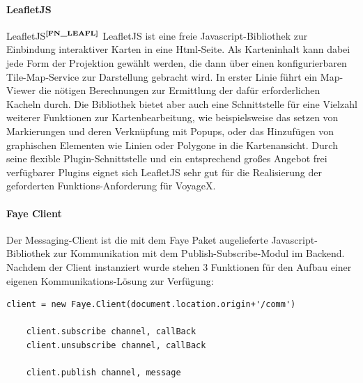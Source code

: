 \paragraph{LeafletJS}{LeafletJS$^{\textbf{\ref{FN_LEAFL}}}$}\label{LEAFL}
LeafletJS ist eine freie Javascript-Bibliothek zur Einbindung interaktiver Karten in eine Html-Seite. Als Karteninhalt kann dabei jede Form der Projektion gewählt werden, die dann über einen konfigurierbaren Tile-Map-Service zur Darstellung gebracht wird. In erster Linie führt ein Map-Viewer die nötigen Berechnungen zur Ermittlung der dafür erforderlichen Kacheln durch. Die Bibliothek bietet aber auch eine Schnittstelle für eine Vielzahl weiterer Funktionen zur Kartenbearbeitung, wie beispielsweise das setzen von Markierungen und deren Verknüpfung mit Popups, oder das Hinzufügen von graphischen Elementen wie Linien oder Polygone in die Kartenansicht. 
Durch seine flexible Plugin-Schnittstelle und ein entsprechend großes Angebot frei verfügbarer Plugins eignet sich LeafletJS sehr gut für die Realisierung der geforderten Funktions-Anforderung für VoyageX.

\paragraph{Faye Client}
Der Messaging-Client ist die mit dem Faye Paket augelieferte Javascript-Bibliothek zur Kommunikation mit dem
Publish-Subscribe-Modul im Backend. Nachdem der Client instanziert wurde stehen 3 Funktionen für den Aufbau einer eigenen Kommunikations-Lösung zur Verfügung:\\
\lstset{language=JavaScript}
\begin{lstlisting}[frame=single,numbers=none,xleftmargin=0pt,caption={API des Faye-Clients},captionpos=b]
    client = new Faye.Client(document.location.origin+'/comm')

    client.subscribe channel, callBack
    client.unsubscribe channel, callBack

    client.publish channel, message
\end{lstlisting}

